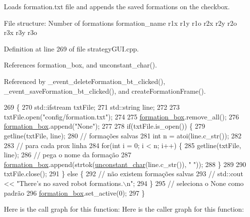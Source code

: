 Loads formation.\+txt file and appends the saved formations on the checkbox. 

File structure\+: Number of formations formation\+\_\+name r1x r1y r1o r2x r2y r2o r3x r3y r3o 

Definition at line 269 of file strategy\+G\+U\+I.\+cpp.



References formation\+\_\+box, and unconstant\+\_\+char().



Referenced by \+\_\+event\+\_\+delete\+Formation\+\_\+bt\+\_\+clicked(), \+\_\+event\+\_\+save\+Formation\+\_\+bt\+\_\+clicked(), and create\+Formation\+Frame().


\begin{DoxyCode}
269                                       \{
270     std::ifstream txtFile;
271     std::string line;
272 
273     txtFile.open(\textcolor{stringliteral}{"config/formation.txt"});
274 
275     \hyperlink{class_strategy_g_u_i_a0f2ab3a2cdca1663def9c4ec1e366a5d}{formation\_box}.remove\_all();
276     \hyperlink{class_strategy_g_u_i_a0f2ab3a2cdca1663def9c4ec1e366a5d}{formation\_box}.append(\textcolor{stringliteral}{"None"});
277 
278     \textcolor{keywordflow}{if}(txtFile.is\_open()) \{
279         getline(txtFile, line);
280         \textcolor{comment}{// formações salvas}
281         \textcolor{keywordtype}{int} n = atoi(line.c\_str());
282 
283         \textcolor{comment}{// para cada prox linha}
284         \textcolor{keywordflow}{for}(\textcolor{keywordtype}{int} i = 0; i < n; i++) \{
285             getline(txtFile, line);
286             \textcolor{comment}{// pega o nome da formação}
287             \hyperlink{class_strategy_g_u_i_a0f2ab3a2cdca1663def9c4ec1e366a5d}{formation\_box}.append(strtok(\hyperlink{class_strategy_g_u_i_a6d19f90621b2b2d6cad000b196e697d9}{unconstant\_char}(line.c\_str()), \textcolor{stringliteral}{" "}));
288         \}
289 
290         txtFile.close();
291     \} \textcolor{keywordflow}{else} \{
292         \textcolor{comment}{// não existem formações salvas}
293         \textcolor{comment}{// std::cout << "There's no saved robot formations.\(\backslash\)n";}
294     \}
295     \textcolor{comment}{// seleciona o None como padrão}
296     \hyperlink{class_strategy_g_u_i_a0f2ab3a2cdca1663def9c4ec1e366a5d}{formation\_box}.set\_active(0);
297 \}
\end{DoxyCode}
Here is the call graph for this function\+:
Here is the caller graph for this function\+:
\mbox{\label{class_strategy_g_u_i_a6d19f90621b2b2d6cad000b196e697d9}} 
